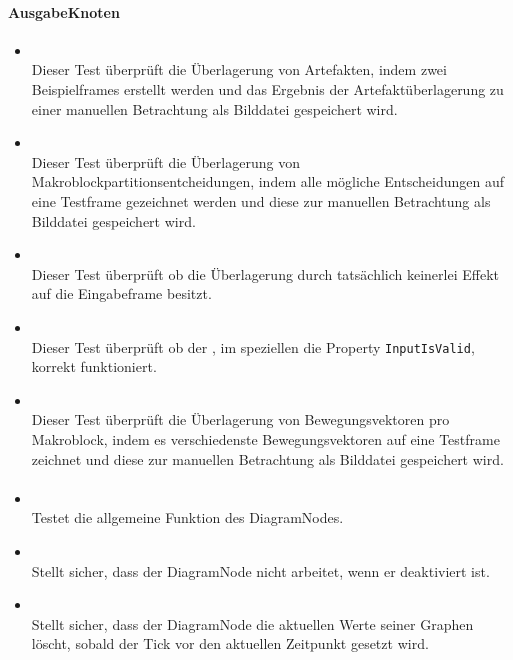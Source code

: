 \paragraph{AusgabeKnoten}

\begin{itemize}

\item{}~\\
Dieser Test überprüft die Überlagerung von Artefakten, indem zwei Beispielframes erstellt werden und das Ergebnis der Artefaktüberlagerung zu einer manuellen Betrachtung als Bilddatei gespeichert wird.

\item{}~\\
Dieser Test überprüft die Überlagerung von Makroblockpartitionsentcheidungen, indem alle mögliche Entscheidungen auf eine Testframe gezeichnet werden und diese zur manuellen Betrachtung als Bilddatei gespeichert wird.

\item{}~\\
Dieser Test überprüft ob die Überlagerung durch  tatsächlich keinerlei Effekt auf die Eingabeframe besitzt.

\item{}~\\
Dieser Test überprüft ob der , im speziellen die Property \verb#InputIsValid#, korrekt funktioniert.

\item{}~\\
Dieser Test überprüft die Überlagerung von Bewegungsvektoren pro Makroblock, indem es verschiedenste Bewegungsvektoren auf eine Testframe zeichnet und diese zur manuellen Betrachtung als Bilddatei gespeichert wird.

\end{itemize}

\paragraph{}
\begin{itemize}
	\item{} \\
		Testet die allgemeine Funktion des DiagramNodes.
	\item{} \\
		Stellt sicher, dass der DiagramNode nicht arbeitet, wenn er deaktiviert ist.
	
	\item{} \\
		Stellt sicher, dass der DiagramNode die aktuellen Werte seiner Graphen löscht, sobald der Tick vor den aktuellen Zeitpunkt gesetzt wird.
\end{itemize}


